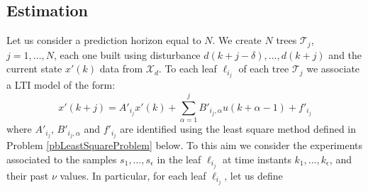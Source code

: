 \documentclass[letterpaper, 10 pt, conference]{ifacconf}  %
\begin{document}
\subsection{Estimation}\label{ssecEstimation}
Let us consider a prediction horizon equal to $N$. We create $N$ trees $\mathcal{T}_j$, $j = 1,\ldots,N$, each one built using disturbance $d(k+j-\delta),\ldots,d(k + j)$ and the current state $x'(k)$ data from $\mathcal{X}_d$. To each leaf $\ell_{i_j}$ of each tree $\mathcal{T}_j$ we associate a LTI model of the form:
\begin{equation}\label{eqLTIleaves}
	x'(k+j) = A'_{i_j}x'(k) + \sum_{\alpha = 1}^{j}{B'_{i_j,\alpha}u(k+\alpha-1)} + f'_{i_j}
\end{equation}
where $A'_{i_j}$, $B'_{i_j,\alpha}$ and $f'_{i_j}$ are identified using the least square method defined in Problem \ref{pbLeastSquareProblem} below. To this aim we consider the experiments associated to the samples $s_1,\ldots,s_\epsilon$ in the leaf $\ell_{i_j}$ at time instants $k_1,\ldots,k_\epsilon$, and their past $\nu$ values. In particular, for each leaf $\ell_{i_j}$, let us define
\small
\end{document}
